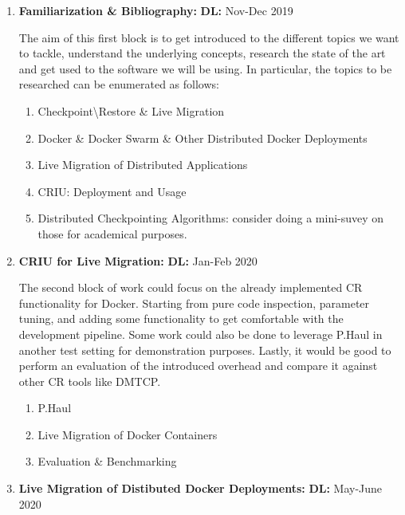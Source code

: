 \documentclass[a4paper, 10pt]{article}
\begin{document}
\begin{enumerate}
    \item \textbf{Familiarization \& Bibliography:} \hfill \textbf{DL:} Nov-Dec 2019

        The aim of this first block is to get introduced to the different topics we want to tackle, understand the underlying concepts, research the state of the art and get used to the software we will be using. In particular, the topics to be researched can be enumerated as follows:
    \begin{enumerate}
        \item Checkpoint\textbackslash Restore \& Live Migration
        \item Docker \& Docker Swarm \& Other Distributed Docker Deployments
        \item Live Migration of Distributed Applications
        \item CRIU: Deployment and Usage
        \item Distributed Checkpointing Algorithms: consider doing a mini-suvey on those for academical purposes.
    \end{enumerate}
    \item \textbf{CRIU for Live Migration:} \hfill \textbf{DL:} Jan-Feb 2020

        The second block of work could focus on the already implemented CR functionality for Docker. Starting from pure code inspection, parameter tuning, and adding some functionality to get comfortable with the development pipeline. Some work could also be done to leverage P.Haul in another test setting for demonstration purposes. Lastly, it would be good to perform an evaluation of the introduced overhead and compare it against other CR tools like DMTCP.
    \begin{enumerate}
        \item P.Haul
        \item Live Migration of Docker Containers
        \item Evaluation \& Benchmarking
    \end{enumerate}
    \item \textbf{Live Migration of Distibuted Docker Deployments:} \hfill \textbf{DL:} May-June 2020


\end{enumerate}
\end{document}
